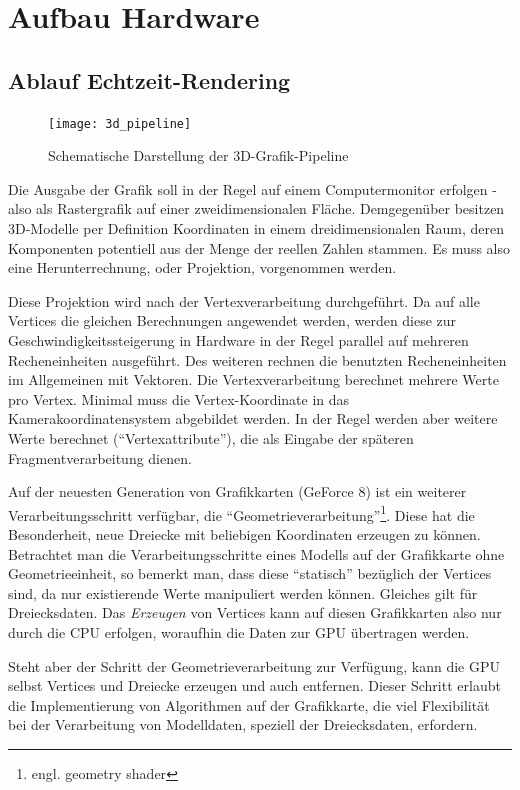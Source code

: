 \documentclass[twoside,a4paper,fleqn,12pt]{book}
\begin{document}
\section{Aufbau Hardware}

\subsection{Ablauf Echtzeit-Rendering}

\begin{figure}[h]
  \centering
  \texttt{[image: 3d\_pipeline]}
  \caption{Schematische Darstellung der 3D-Grafik-Pipeline}
  \label{fig:3d_pipeline}
\end{figure}

Die Ausgabe der Grafik soll in der Regel auf einem Computermonitor erfolgen - also als Rastergrafik auf einer zweidimensionalen Fläche.
Demgegenüber besitzen 3D-Modelle per Definition Koordinaten in einem dreidimensionalen Raum, deren Komponenten potentiell
aus der Menge der reellen Zahlen stammen. Es muss also eine Herunterrechnung, oder Projektion, vorgenommen werden. 

Diese Projektion wird nach der Vertexverarbeitung durchgeführt. Da auf alle Vertices die gleichen
Berechnungen angewendet werden, werden diese zur Geschwindigkeitssteigerung in Hardware in der Regel parallel 
auf mehreren Recheneinheiten ausgeführt. 
Des weiteren rechnen die benutzten Recheneinheiten im Allgemeinen mit Vektoren.
Die Vertexverarbeitung berechnet mehrere Werte pro Vertex. Minimal muss die Vertex-Koordinate in das Kamerakoordinatensystem
abgebildet werden. In der Regel werden aber weitere Werte berechnet ("`Vertexattribute"'), die als Eingabe der späteren Fragmentverarbeitung dienen.

Auf der neuesten Generation von Grafikkarten (GeForce 8) %
ist ein weiterer Verarbeitungsschritt verfügbar, die "`Geometrieverarbeitung"'\footnote{engl. geometry shader}. 
Diese hat die Besonderheit, neue Dreiecke
mit beliebigen Koordinaten erzeugen zu können. Betrachtet man die Verarbeitungsschritte eines Modells auf der
Grafikkarte ohne Geometrieeinheit, so bemerkt man, dass diese "`statisch"' bezüglich der Vertices sind, da nur existierende
Werte manipuliert werden können. Gleiches gilt für Dreiecksdaten. Das \emph{Erzeugen} von Vertices kann auf diesen Grafikkarten
also nur durch die CPU erfolgen, woraufhin die Daten zur GPU übertragen werden.

 Steht aber der Schritt der Geometrieverarbeitung zur Verfügung, kann die GPU selbst Vertices und Dreiecke erzeugen
und auch entfernen. Dieser Schritt erlaubt die Implementierung von Algorithmen auf der Grafikkarte, die viel 
Flexibilität bei der Verarbeitung von Modelldaten, speziell der Dreiecksdaten, erfordern.
\end{document}
